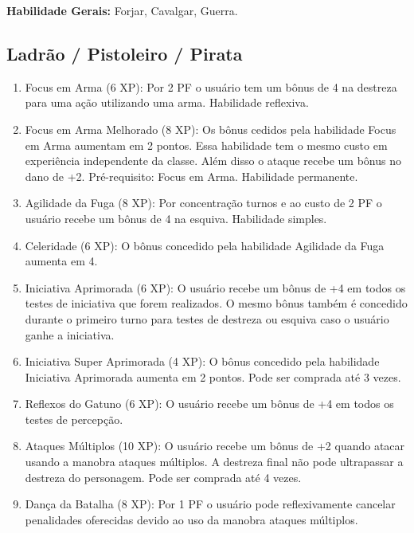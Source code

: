 \textbf{Habilidade Gerais:} Forjar, Cavalgar, Guerra.

\subsection{Ladrão / Pistoleiro / Pirata}

\begin{enumerate}

	\item Focus em Arma (6 XP): Por 2 PF o usuário tem um bônus de 4 na destreza para uma ação utilizando uma arma. Habilidade reflexiva.

	\item Focus em Arma Melhorado (8 XP): Os bônus cedidos pela habilidade Focus em Arma aumentam em 2 pontos. Essa habilidade tem o mesmo custo em experiência independente da classe. Além disso o ataque recebe um bônus no dano de +2. Pré-requisito: Focus em Arma. Habilidade permanente.

	\item Agilidade da Fuga (8 XP): Por concentração turnos e ao custo de 2 PF o usuário recebe um bônus de 4 na esquiva. Habilidade simples.
	
	\item Celeridade (6 XP): O bônus concedido pela habilidade Agilidade da Fuga aumenta em 4.
	
	\item Iniciativa Aprimorada (6 XP): O usuário recebe um bônus de +4 em todos os testes de iniciativa que forem realizados. O mesmo bônus também é concedido durante o primeiro turno para testes de destreza ou esquiva caso o usuário ganhe a iniciativa.

	\item Iniciativa Super Aprimorada (4 XP): O bônus concedido pela habilidade Iniciativa Aprimorada aumenta em 2 pontos. Pode ser comprada até 3 vezes.

	\item Reflexos do Gatuno (6 XP): O usuário recebe um bônus de +4 em todos os testes de percepção.

	\item Ataques Múltiplos (10 XP): O usuário recebe um bônus de +2 quando atacar usando a manobra ataques múltiplos. A destreza final não pode ultrapassar a destreza do personagem. Pode ser comprada até 4 vezes. 

	\item Dança da Batalha (8 XP): Por 1 PF o usuário pode reflexivamente cancelar penalidades oferecidas devido ao uso da manobra ataques múltiplos.
	

\end{enumerate}
